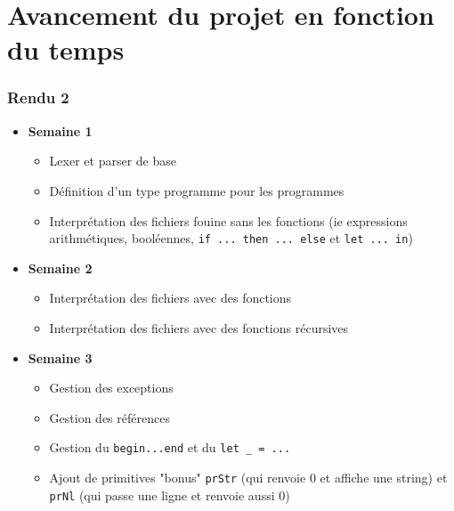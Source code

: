 \section{Avancement du projet en fonction du temps}
\subsubsection*{Rendu 2}
\begin{itemize}
 \item \textbf{Semaine 1} 
    \begin{itemize}
    \item Lexer et parser de base

    \item Définition d'un type programme pour les programmes \fouine

    \item Interprétation des fichiers fouine sans les fonctions
      (ie expressions arithmétiques, booléennes, \texttt{if ... then ... else} et \texttt{let ... in})
    \end{itemize}
    
  \item \textbf{Semaine 2 }
    \begin{itemize}
      \item Interprétation des fichiers \fouine avec des fonctions
      \item Interprétation des fichiers \fouine avec des fonctions récursives
    \end{itemize}
  
  \item \textbf{ Semaine 3 }
    \begin{itemize}
    \item Gestion des exceptions
    \item Gestion des références
    \item Gestion du \texttt{begin...end} et du \texttt{let \_ = ...}
    \item Ajout de primitives "bonus" \texttt{prStr} (qui renvoie 0 et affiche une string) et \texttt{prNl} (qui passe une ligne et renvoie aussi 0)
    \end{itemize}
\end{itemize}

